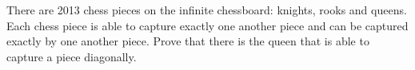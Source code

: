 \problem
There are 2013 chess pieces on the infinite chessboard: knights, rooks and
queens.
Each chess piece is able to capture exactly one another piece and can be
captured exactly by one another piece.
Prove that there is the queen that is able to capture a piece diagonally.
\solution
\endproblem

